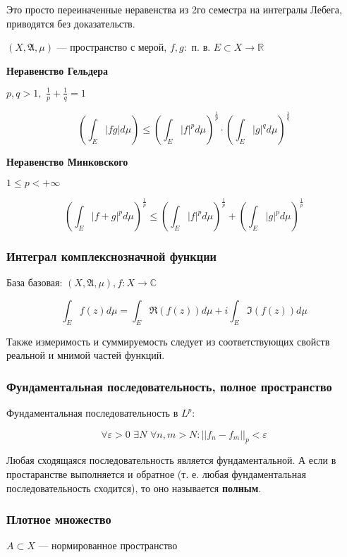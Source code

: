\documentclass{article}
\def\dbl{\,\,}
\begin{document}
Это просто переиначенные неравенства из 2го семестра на интегралы Лебега, приводятся без доказательств.

$(X, \mathfrak{A}, \mu)$ --- пространство с мерой, $f, g: $ п. в. $E \subset X \rightarrow \mathbb{R}$

\textbf{Неравенство Гельдера}

$p, q > 1, \dbl \frac{1}{p} + \frac{1}{q} = 1$

\[\left(\int_{E} |fg| d\mu \right) \le \left(\int_{E} |f|^p d\mu\right)^{\frac{1}{p}} \cdot \left(\int_{E} |g|^q d\mu\right)^{\frac{1}{q}}\]

\textbf{Неравенство Минковского}

$1 \le p < + \infty$

\[\left(\int_{E} |f + g|^p d\mu \right)^{\frac{1}{p}} \le \left(\int_{E} |f|^p d\mu\right)^{\frac{1}{p}} + \left(\int_{E} |g|^p d\mu\right)^{\frac{1}{p}}\]

\subsubsection{Интеграл комплекснозначной функции}

База базовая: $(X, \mathfrak{A}, \mu), f: X \rightarrow \mathbb{C}$

\[\int_{E}f(z)d\mu = \int_{E}\Re(f(z))d\mu + i\int_{E}\Im(f(z))d\mu\]

Также измеримость и суммируемость следует из соответствующих свойств реальной и мнимой частей функций.

\subsubsection{Фундаментальная последовательность, полное пространство}

Фундаментальная последовательность в $L^p$:

\[\forall \varepsilon > 0 \dbl \exists N \dbl \forall n, m > N: ||f_n - f_m||_p < \varepsilon\]

Любая сходящаяся последовательность является фундаментальной. А если в простаранстве выполняется и обратное (т. е. любая фундаментальная последовательность сходится), то оно называется \textbf{полным}.

\subsubsection{Плотное множество}

$A \subset X$ --- нормированное пространство
\end{document}
